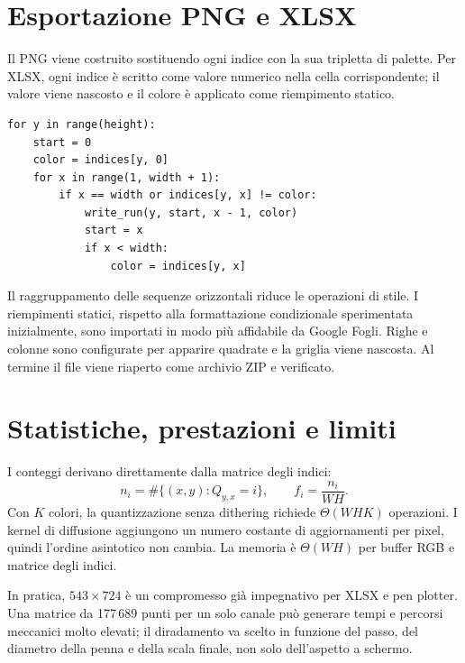\documentclass[11pt,a4paper]{article}
\begin{document}
\section{Esportazione PNG e XLSX}
Il PNG viene costruito sostituendo ogni indice con la sua tripletta di palette. Per XLSX, ogni indice è scritto come valore numerico nella cella corrispondente; il valore viene nascosto e il colore è applicato come riempimento statico.
\begin{lstlisting}[style=py]
for y in range(height):
    start = 0
    color = indices[y, 0]
    for x in range(1, width + 1):
        if x == width or indices[y, x] != color:
            write_run(y, start, x - 1, color)
            start = x
            if x < width:
                color = indices[y, x]
\end{lstlisting}
Il raggruppamento delle sequenze orizzontali riduce le operazioni di stile. I riempimenti statici, rispetto alla formattazione condizionale sperimentata inizialmente, sono importati in modo più affidabile da Google Fogli. Righe e colonne sono configurate per apparire quadrate e la griglia viene nascosta. Al termine il file viene riaperto come archivio ZIP e verificato.

\section{Statistiche, prestazioni e limiti}
I conteggi derivano direttamente dalla matrice degli indici:
\[n_i=\#\{(x,y):Q_{y,x}=i\},\qquad f_i=\frac{n_i}{WH}.\]
Con $K$ colori, la quantizzazione senza dithering richiede $\Theta(WHK)$ operazioni. I kernel di diffusione aggiungono un numero costante di aggiornamenti per pixel, quindi l'ordine asintotico non cambia. La memoria è $\Theta(WH)$ per buffer RGB e matrice degli indici.

In pratica, $543\times724$ è un compromesso già impegnativo per XLSX e pen plotter. Una matrice da 177\,689 punti per un solo canale può generare tempi e percorsi meccanici molto elevati; il diradamento va scelto in funzione del passo, del diametro della penna e della scala finale, non solo dell'aspetto a schermo.
\end{document}
